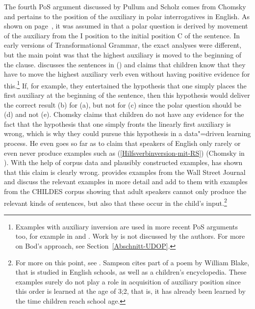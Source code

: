 The fourth PoS argument discussed by Pullum and Scholz comes from Chomsky and pertains to the
position of the auxiliary in polar interrogatives in English. As shown on page~\pageref{Seite-GB-Entscheidungsfragen-Englisch},
it was assumed in \gbt that a polar question is derived by movement of the auxiliary from the I position to the initial position C of
the sentence. In early versions of Transformational Grammar, the exact analyses were different, but the main point was that the
highest auxiliary is moved to the beginning of the clause. 
 \citet[--33]{Chomsky71a-u}
discusses the sentences in () and claims that children know that they have to move the highest auxiliary verb even without having
positive evidence for this.\footnote{%
	Examples with auxiliary inversion are used in more recent PoS arguments too, for example in 
   and . Work by \citet{Bod2009a} is not discussed by the authors.
  For more on Bod's approach, see Section~\ref{Abschnitt-UDOP}.%
} If, for example, they entertained the hypothesis that one simply places the first auxiliary at the beginning of the sentence, then
this hypothesis would deliver the correct result (b) for (a), but not for (c) since the polar question should
be (d) and not (e).
\eal
{}
\zl
Chomsky claims that children do not have any evidence for the fact that the hypothesis that one
simply fronts the linearly first auxiliary is wrong, which is why they could pursue this hypothesis in a data"=driven learning process. He even goes so
far as to claim that speakers of English only rarely or even never produce examples such as (\ref{Hilfsverbinversion-mit-RS})
(Chomsky in
). 
With the help of corpus data and plausibly constructed examples, \citet{Pullum96a} has shown that this claim is clearly wrong.
 \citet{Pullum96a} provides examples from the Wall Street Journal and \citet{PS2002a} discuss the relevant examples in more detail
 and add to them with examples from the CHILDES corpus showing  that adult speakers cannot only produce the relevant
 kinds of sentences, but also that these occur in the child's input.\footnote{%
For more on this point, see . Sampson cites part of a poem by William Blake, that is studied in English schools, as well as
a children's encyclopedia. These examples surely do not play a role in acquisition of auxiliary position since this order is learned at the age of
3;2, that is, it has already been learned by the time children reach school age.%
}
